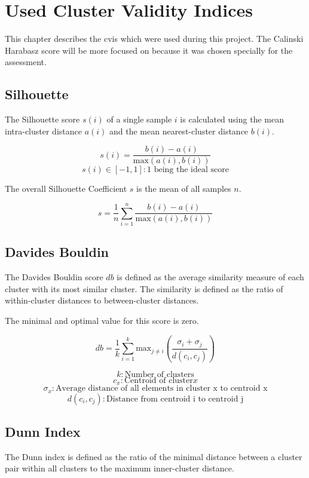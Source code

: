 \chapter{Used Cluster Validity Indices}

This chapter describes the \acp{cvi} which were used during this project. The Calinski Harabasz score will be more focused on because it was chosen specially for the assessment.

\section{Silhouette}

The Silhouette score $s(i)$ of a single sample $i$ is calculated using the mean intra-cluster distance $a(i)$ and the mean nearest-cluster distance $b(i)$.

$$ s(i) = \frac{b(i) - a(i)}{\text{max}(a(i), b(i))} $$
$$ s(i) \in [-1, 1] : \text{1 being the ideal score}$$

The overall Silhouette Coefficient $s$ is the mean of all samples $n$.

$$ s = \frac{1}{n} \sum_{i=1}^{n}\frac{b(i) - a(i)}{\text{max}(a(i), b(i))} $$


\clearpage
\section{Davides Bouldin}

The Davides Bouldin score $db$ is defined as the average similarity measure of each cluster with its most similar cluster. The similarity is defined as the ratio of within-cluster distances to between-cluster distances. 


The minimal and optimal value for this score is zero.


$$ db = \frac{1}{k} \sum_{i=1}^{k} \text{max}_{j \neq i} \left(\frac{\sigma_{i} + \sigma_{j}}{d(c_{i}, c_{j})}\right)$$

$$k: \text{Number of clusters}$$
$$c_{x}: \text{Centroid of cluster} x$$
$$\sigma_{x}: \text{Average distance of all elements in cluster x to centroid x}$$
$$d(c_{i}, c_{j}): \text{Distance from centroid i to centroid j}$$




\section{Dunn Index}

The Dunn index is defined as the ratio of the minimal distance between a cluster pair within all clusters to the maximum inner-cluster distance.

